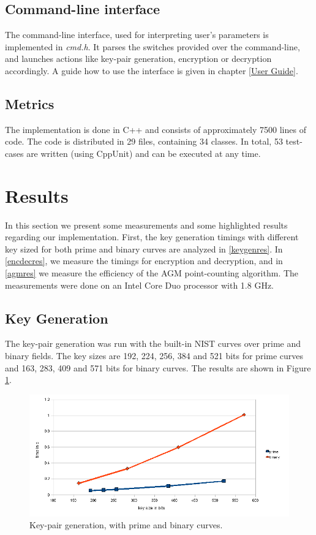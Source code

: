 \documentclass[11pt,english]{article}
\begin{document}
\subsection{Command-line interface}
The command-line interface, used for interpreting user's parameters is implemented in \emph{cmd.h}. It parses the switches provided over the command-line, and launches actions like key-pair generation, encryption or decryption accordingly. A guide how to use the interface is given in chapter \ref{User Guide}.

\subsection{Metrics}
The implementation is done in C++ and consists of approximately 7500 lines of code. The code is distributed in 29 files, containing 34 classes. In total, 53 test-cases are written (using CppUnit) and can be executed at any time.

\section{Results}
In this section we present some measurements and some highlighted results regarding our implementation. First, the key generation timings with different key sized for both prime and binary curves are analyzed in \ref{keygenres}. In \ref{encdecres}, we measure the timings for encryption and decryption, and in \ref{agmres} we measure the efficiency of the AGM point-counting algorithm. The measurements were done on an Intel Core Duo processor with 1.8 GHz.

\subsection{Key Generation}
The key-pair generation was run with the built-in NIST curves over prime and binary fields. The key sizes are 192, 224, 256, 384 and 521 bits for prime curves and 163, 283, 409 and 571 bits for binary curves. The results are shown in Figure \ref{figure:keygen}.

\label{keygenres}
\begin{figure}[h]
\centering
\includegraphics[scale=0.6]{keygen.png}
\caption{Key-pair generation, with prime and binary curves.}
\label{figure:keygen}
\end{figure}
\end{document}
